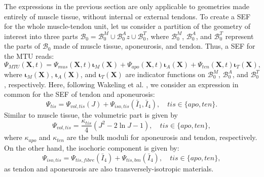 \documentclass{sfuthesis}
\numberwithin{equation}{section}
\numberwithin{figure}{chapter}
\numberwithin{table}{chapter}
\theoremstyle{definition}
\def\*#1{{\mathbf{#1}}} %
\newcommand{\B}{\mathcal{B}}
\newcommand{\I}{{\bar{I}}}
\begin{document}
The expressions in the previous section are only applicable to geometries made entirely of muscle tissue, without internal or external tendons. To create a SEF for the whole muscle-tendon unit, let us consider a partition of the geometry of interest into three parts $\B_0 = \B_0^M \cup \B_0^A z \cup \B_0^T$, where $\B_0^M$, $\B_0^A$, and $\B_0^T$ represent the parts of $\B_0$ made of muscle tissue, aponeurosis, and tendon. Thus, a SEF for the MTU reads:
\begin{equation}
    \Psi_{MTU}(\*X,t) = \Psi_{mus}(\*X,t) \bm{\iota}_M(\*X) + \Psi_{apo}(\*X,t) \bm{\iota}_A(\*X) + \Psi_{ten}(\*X,t) \bm{\iota}_T(\*X),
\end{equation}
where $\bm{\iota}_M(\*X)$, $\bm{\iota}_A(\*X)$, and $\bm{\iota}_T(\*X)$ are indicator functions on $\B_0^M$, $\B_0^A$, and $\B_0^T$, respectively. Here, following Wakeling et al. \cite{Paper1_WakelingEtAl2020}, we consider an expression in common for the SEF of tendon and aponeurosis:
\begin{equation}
    \Psi_{tis} = \Psi_{vol,tis}(J) + \Psi_{iso,tis}(\I_1,\I_4), \quad tis \in \{apo,ten\}.
\end{equation}
Similar to muscle tissue, the volumetric part is given by
\begin{equation}
    \Psi_{vol,tis} = \dfrac{\kappa_{tis}}{4} \left( J^2 - 2\ln J - 1 \right), \quad tis \in \{apo,ten\},
\end{equation}
where $\kappa_{apo}$ and $\kappa_{ten}$ are the bulk moduli for aponeurosis and tendon, respectively. On the other hand, the isochoric component is given by:
\begin{equation}
    \Psi_{iso,tis} = \Psi_{tis,fibre}(\I_4) + \Psi_{tis,bm}(\I_4), \quad tis \in \{apo,ten\},
\end{equation}
as tendon and aponeurosis are also transversely-isotropic materials.
\end{document}
